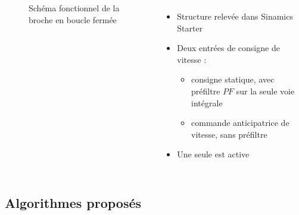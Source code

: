 \documentclass{style/presentation}
\begin{document}
\begin{frame}

    \begin{columns}
        \begin{figure}
            \centering
            \resizebox{\linewidth}{!}{}
            \caption{Schéma fonctionnel de la broche en boucle fermée}
        \end{figure}

        \begin{itemize}
            \item Structure relevée dans Sinamics Starter
            \item Deux entrées de consigne de vitesse :
                  \begin{itemize}
                      \item consigne statique, avec préfiltre $P\!F$ sur la seule voie intégrale
                      \item commande anticipatrice de vitesse, sans préfiltre
                  \end{itemize}
            \item \alert{Une seule est active}
        \end{itemize}
    \end{columns}

\end{frame}

\subsection{Algorithmes proposés}
\end{document}
